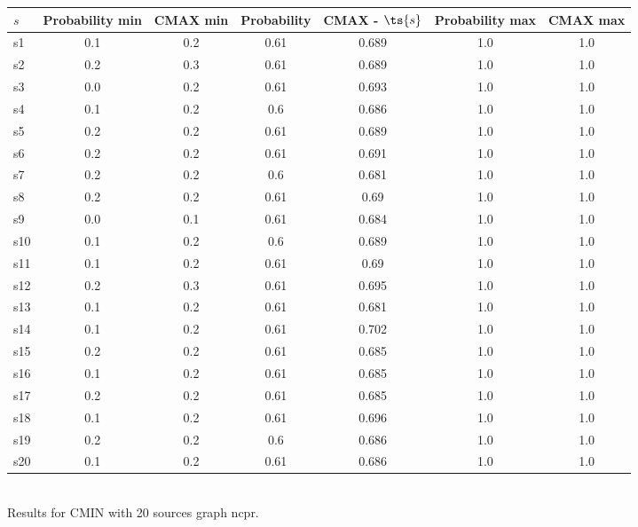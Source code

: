 \documentclass{article}
\begin{document}
\noindent\begin{tabular}{|l|c|c|c|c|c|c|}
\hline
$s$& Probability min & CMAX min & Probability & CMAX - $\ts{s}$ & Probability max & CMAX max\\
\hline
s1 &0.1 & 0.2 & 0.61 & 0.689 & 1.0 & 1.0\\
\hline
s2 &0.2 & 0.3 & 0.61 & 0.689 & 1.0 & 1.0\\
\hline
s3 &0.0 & 0.2 & 0.61 & 0.693 & 1.0 & 1.0\\
\hline
s4 &0.1 & 0.2 & 0.6 & 0.686 & 1.0 & 1.0\\
\hline
s5 &0.2 & 0.2 & 0.61 & 0.689 & 1.0 & 1.0\\
\hline
s6 &0.2 & 0.2 & 0.61 & 0.691 & 1.0 & 1.0\\
\hline
s7 &0.2 & 0.2 & 0.6 & 0.681 & 1.0 & 1.0\\
\hline
s8 &0.2 & 0.2 & 0.61 & 0.69 & 1.0 & 1.0\\
\hline
s9 &0.0 & 0.1 & 0.61 & 0.684 & 1.0 & 1.0\\
\hline
s10 &0.1 & 0.2 & 0.6 & 0.689 & 1.0 & 1.0\\
\hline
s11 &0.1 & 0.2 & 0.61 & 0.69 & 1.0 & 1.0\\
\hline
s12 &0.2 & 0.3 & 0.61 & 0.695 & 1.0 & 1.0\\
\hline
s13 &0.1 & 0.2 & 0.61 & 0.681 & 1.0 & 1.0\\
\hline
s14 &0.1 & 0.2 & 0.61 & 0.702 & 1.0 & 1.0\\
\hline
s15 &0.2 & 0.2 & 0.61 & 0.685 & 1.0 & 1.0\\
\hline
s16 &0.1 & 0.2 & 0.61 & 0.685 & 1.0 & 1.0\\
\hline
s17 &0.2 & 0.2 & 0.61 & 0.685 & 1.0 & 1.0\\
\hline
s18 &0.1 & 0.2 & 0.61 & 0.696 & 1.0 & 1.0\\
\hline
s19 &0.2 & 0.2 & 0.6 & 0.686 & 1.0 & 1.0\\
\hline
s20 &0.1 & 0.2 & 0.61 & 0.686 & 1.0 & 1.0\\
\hline
\end{tabular}\\

\noindent Results for CMIN with 20 sources graph ncpr.
\end{document}
